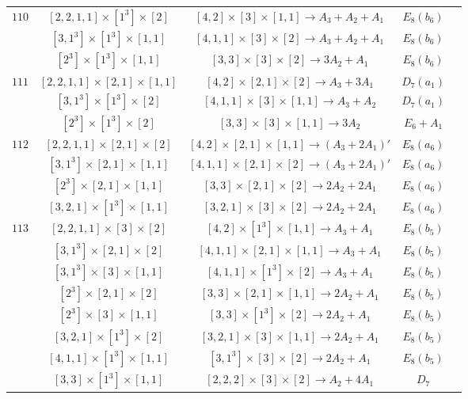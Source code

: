 \documentclass[reqno,12pt]{amsart}
\numberwithin{equation}{section}
\theoremstyle{plain}
\theoremstyle{definition}
\begin{document}
\begin{table}[htbp]
{\begin{tabular}{|c|c|c|c|c|}
$ 110$   &  $ [2,2,1,1]\times [1^3]\times [2] $  &$[4,2]\times [3]\times [1,1]\rightarrow      A_3+A_2+A_1 $  &   $E_8(b_6) $  \\
&  $ [3,1^3]\times [1^3]\times [1,1] $  &$[4,1,1]\times [3]\times [2]\rightarrow      A_3+A_2+A_1 $  &   $E_8(b_6) $  \\
&  $ [2^3]\times [1^3]\times [1,1] $  &$[3,3]\times [3]\times [2]\rightarrow      3A_2+A_1 $  &   $E_8(b_6) $  \\
\hline

$ 111$   &  $ [2,2,1,1]\times [2,1]\times [1,1] $  &$[4,2]\times [2,1]\times [2]\rightarrow      A_3+3A_1 $  &   $D_7(a_1) $  \\
&  $ [3,1^3]\times [1^3]\times [2] $  &$[4,1,1]\times [3]\times [1,1]\rightarrow      A_3+A_2 $  &   $D_7(a_1) $  \\
&  $ [2^3]\times [1^3]\times [2] $  &$[3,3]\times [3]\times [1,1]\rightarrow      3A_2 $  &   $E_6+A_1 $  \\
\hline

$ 112$   &  $ [2,2,1,1]\times [2,1]\times [2] $  &$[4,2]\times [2,1]\times [1,1]\rightarrow      (A_3+2A_1)' $  &   $E_8(a_6) $  \\

&  $ [3,1^3]\times [2,1]\times [1,1] $  &$[4,1,1]\times [2,1]\times [2]\rightarrow      (A_3+2A_1)' $  &   $E_8(a_6) $  \\

&  $ [2^3]\times [2,1]\times [1,1] $  &$[3,3]\times [2,1]\times [2]\rightarrow      2A_2+2A_1 $  &   $E_8(a_6) $  \\
&  $ [3,2,1]\times [1^3]\times [1,1] $  &$[3,2,1]\times [3]\times [2]\rightarrow      2A_2+2A_1 $  &   $E_8(a_6) $  \\
\hline

$ 113$   &  $ [2,2,1,1]\times [3]\times [2] $  &$[4,2]\times [1^3]\times [1,1]\rightarrow      A_3+A_1 $  &   $E_8(b_5) $  \\
&  $ [3,1^3]\times [2,1]\times [2] $  &$[4,1,1]\times [2,1]\times [1,1]\rightarrow      A_3+A_1 $  &   $E_8(b_5) $  \\
&  $ [3,1^3]\times [3]\times [1,1] $  &$[4,1,1]\times [1^3]\times [2]\rightarrow      A_3+A_1 $  &   $E_8(b_5) $  \\
&  $ [2^3]\times [2,1]\times [2] $  &$[3,3]\times [2,1]\times [1,1]\rightarrow      2A_2+A_1 $  &   $E_8(b_5) $  \\
&  $ [2^3]\times [3]\times [1,1] $  &$[3,3]\times [1^3]\times [2]\rightarrow      2A_2+A_1 $  &   $E_8(b_5) $  \\
  &  $ [3,2,1]\times [1^3]\times [2] $  &$[3,2,1]\times [3]\times [1,1]\rightarrow      2A_2+A_1 $  &   $E_8(b_5) $  \\
&  $ [4,1,1]\times [1^3]\times [1,1] $  &$[3,1^3]\times [3]\times [2]\rightarrow      2A_2+A_1 $  &   $E_8(b_5) $  \\
&  $ [3,3]\times [1^3]\times [1,1] $  &$[2,2,2]\times [3]\times [2]\rightarrow      A_2+4A_1 $  &   $D_7 $  \\
\hline




\end{tabular}}
\end{table}
\end{document}
